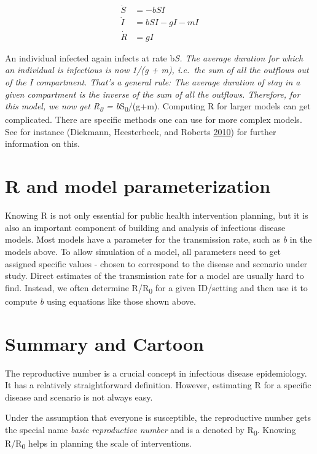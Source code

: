 \documentclass[]{book}
\theoremstyle{definition}
\theoremstyle{definition}
\theoremstyle{definition}
\theoremstyle{remark}
\begin{document}
\[ 
\begin{aligned}
\dot S &= -b SI \\
\dot I &= b S I - g I - m I\\
\dot R &= g I
\end{aligned}
\]

An individual infected again infects at rate b\emph{S. The average
duration for which an individual is infectious is now 1/(g + m),
i.e.~the sum of all the outflows out of the \emph{I} compartment. That's
a general rule: The average duration of stay in a given compartment is
the inverse of the sum of all the outflows. Therefore, for this model,
we now get R\textsubscript{0} = b}S\textsubscript{0}/(g+m). Computing R
for larger models can get complicated. There are specific methods one
can use for more complex models. See for instance (Diekmann,
Heesterbeek, and Roberts \protect\hyperlink{ref-diekmann10}{2010}) for
further information on this.

\section{R and model
parameterization}\label{r-and-model-parameterization}

Knowing R is not only essential for public health intervention planning,
but it is also an important component of building and analysis of
infectious disease models. Most models have a parameter for the
transmission rate, such as \emph{b} in the models above. To allow
simulation of a model, all parameters need to get assigned specific
values - chosen to correspond to the disease and scenario under study.
Direct estimates of the transmission rate for a model are usually hard
to find. Instead, we often determine R/R\textsubscript{0} for a given
ID/setting and then use it to compute \emph{b} using equations like
those shown above.

\section{Summary and Cartoon}\label{summary-and-cartoon-3}

The reproductive number is a crucial concept in infectious disease
epidemiology. It has a relatively straightforward definition. However,
estimating R for a specific disease and scenario is not always easy.

Under the assumption that everyone is susceptible, the reproductive
number gets the special name \emph{basic reproductive number} and is a
denoted by R\textsubscript{0}. Knowing R/R\textsubscript{0} helps in
planning the scale of interventions.
\end{document}

